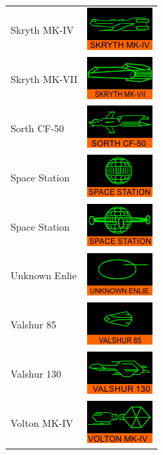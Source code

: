\begin{itemize}
\begin{tabular}{ | l | l | }
Skryth MK-IV & \includegraphics{images/ship_skryth_mk_iv.png} \\
Skryth MK-VII & \includegraphics{images/ship_skryth_mk_vii.png} \\
Sorth CF-50 & \includegraphics{images/ship_sorth_cf_50.png} \\
Space Station & \includegraphics{images/ship_spacestation_1.png} \\
Space Station & \includegraphics{images/ship_spacestation_2.png} \\
Unknown Enlie & \includegraphics{images/ship_unknown_enlie.png} \\
Valshur 85 & \includegraphics{images/ship_valshur_85.png} \\
Valshur 130 & \includegraphics{images/ship_valshur_130.png} \\
Volton MK-IV & \includegraphics{images/ship_volton_mk_iv.png} \\

\end{tabular}
\end{itemize}

